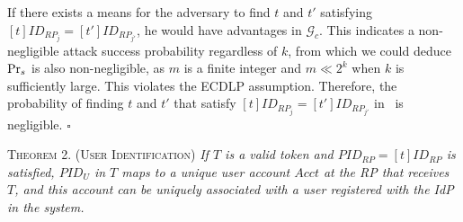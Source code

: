 \newc
If there exists a means for the adversary to find $t$ and $t'$ satisfying $[t]ID_{RP_j} = [t']ID_{RP_{j'}}$, he would have advantages in $\mathcal{G}_c$. This indicates a non-negligible attack success probability regardless of $k$, from which we could deduce ${\rm Pr}_s$ is also non-negligible, as $m$ is a finite integer and $m \ll 2^k$ when $k$ is sufficiently large.
\oldc
This violates the ECDLP assumption. Therefore, the probability of finding $t$ and $t'$ that satisfy $[t]ID_{RP_j} = [t']ID_{RP_{j'}}$ in \usso~is negligible. \hfill $\square$

\newc
\vspace{1mm}
\noindent\textsc{Theorem 2. (User Identification)} {\em If $T$ is a valid token and $PID_{RP} = [t]ID_{RP}$ is satisfied, $PID_U$ in $T$ maps to a unique user account $Acct$ at the RP that receives $T$, and this account can be uniquely associated with a user registered with the IdP in the system.}



